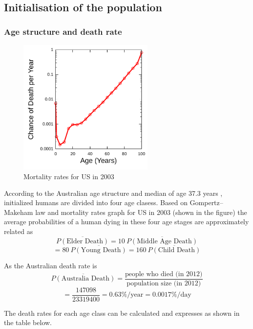 \documentclass[a4paper]{article}
\newcommand*\mean[1]{\overline{#1}}
\begin{document}
\subsection{Initialisation of the population}

\subsubsection{Age structure and death rate}

\begin{figure}[ht]
    \centering
    \includegraphics[width=0.6\textwidth]{USGompertzCurve}
    \caption{Mortality rates for US in 2003}
\end{figure}

According to the Australian age structure\cite{agestructure} and median of age 37.3 years \cite{demographicsaustralia}, initialized humans are divided into four age clasess.
Based on Gompertz–Makeham law \cite{mortalitylaw} and mortality rates graph for US in 2003 (shown in the figure) the average probabilities of a human dying in these four age stages are approximately related as 
$$ \mean{P(\text{Elder Death})} = 10\: \mean{P(\text{Middle Age Death})} $$
$$ = 80\: \mean{P(\text{Young Death})} = 160\: \mean{P(\text{Child Death})} $$

As the Australian death rate \cite{absdeath} is
$$ \mean{P(\text{Australia Death})} = \frac{\text{people who died (in 2012)}}{\text{population size (in 2012)}} $$
$$ = \frac{147098}{23319400} = 0.63\%/\text{year} = 0.0017\%/\text{day} $$

The death rates for each age class can be calculated and expresses as shown in the table below.
\end{document}
